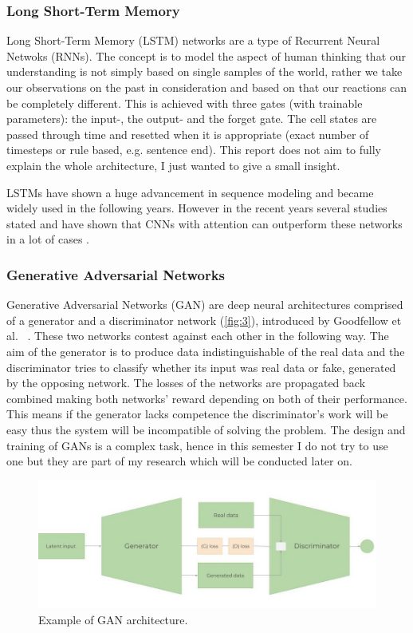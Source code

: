 \documentclass[11pt,a4paper,oneside]{article}
\begin{document}
  \subsubsection{Long Short-Term Memory}
  \label{sec:lstm}

  Long Short-Term Memory (LSTM) networks \cite{lstm, lstm_colah} are a type of Recurrent Neural Netwoks (RNNs). The 
  concept is to model the aspect of human thinking that our understanding is not simply based on single samples of the 
  world, rather we take our observations on the past in consideration and based on that our reactions can be completely 
  different. This is achieved with three gates (with trainable parameters): the input-, the output- and the forget gate. 
  The cell states are passed through time and resetted when it is appropriate (exact number of timesteps or rule based, 
  e.g. sentence end). This report does not aim to fully explain the whole architecture, I just wanted to give a small 
  insight.
  
  LSTMs have shown a huge advancement in sequence modeling and became widely used in the following years. However in the 
  recent years several studies stated and have shown that CNNs with attention can outperform these networks in a lot of 
  cases \cite{eval_conv_lstm, fall_rnn}.

  \subsubsection{Generative Adversarial Networks}
  \label{sec:gans}

  Generative Adversarial Networks (GAN) are deep neural architectures comprised of a generator and a discriminator 
  network (\autoref{fig:3}), introduced by Goodfellow et al. ~\cite{gan}. These two networks contest against each other 
  in the following way. The aim of the generator is to produce data indistinguishable of the real data and the 
  discriminator tries to classify whether its input was real data or fake, generated by the opposing network. The losses 
  of the networks are propagated back combined making both networks’ reward depending on both of their performance. This 
  means if the generator lacks competence the discriminator’s work will be easy thus the system will be incompatible of 
  solving the problem. The design and training of GANs is a complex task, hence in this semester I do not try to use one 
  but they are part of my research which will be conducted later on.

  \begin{figure}[tbh]
    \centering
    \includegraphics[width=12cm]{gan.jpg}
    \caption{Example of GAN architecture.~\cite{boris}}
    \label{fig:3}
  \end{figure}
\end{document}
